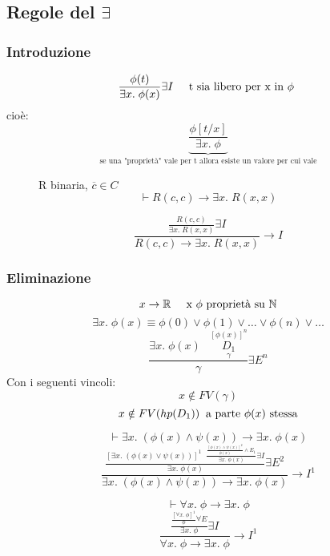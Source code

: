 \documentclass{article}
\theoremstyle{break}
\theoremstyle{break}
\theoremstyle{break}
\theoremstyle{break}
\begin{document}
\subsection{Regole del \( \exists  \)}
\subsubsection{Introduzione}
\[
\frac{\phi(t)}{\exists x.\; \phi(x)} \exists I \;\;\;\;\; \text{t sia libero per x in \( \phi \) }
\] 
cioè:
\[
  \underbrace{\frac{\phi[t/x]}{\exists x.\; \phi}}_{\text{se una "proprietà" vale per t allora
  esiste un valore per cui vale}}
\] 

\begin{figure}[H]
  \begin{example}
    R binaria, \( \overline{c} \in C \) 
    \[
    \vdash R(c,c) \to \exists x.\; R(x,x)
    \] 

    \[
      \frac{\frac{R(c,c)}{\exists x.\; R(x,x)} \exists I}{R(c,c) \to \exists x.\; R(x,x)} \to I
    \] 
  \end{example}
  
\end{figure}

\subsubsection{Eliminazione}
\[
  x \to \mathbb{R} \;\;\;\;\; \text{x \( \phi \) proprietà su \( \mathbb{N} \)}
\] 
\[
  \exists x.\;\phi(x) \equiv \phi(0) \vee \phi(1) \vee \ldots \vee \phi(n) \vee \ldots
\] 
\[
  \frac{\exists x.\;\phi(x) \;\;\; \underset{\gamma}{\stackrel{[\phi(x)]^n}{D_1}}}{\gamma} \exists E^n
\] 
Con i seguenti vincoli:
\[
  x \notin FV(\gamma)
\] 
\[
x \notin FV(hp(D_1))\;\; \text{a parte \( \phi(x) \) stessa}
\] 

\begin{figure}[H]
  \begin{exercise}
    \[
    \vdash \exists x.\; (\phi(x) \wedge \psi(x)) \to \exists x.\; \phi(x)
    \] 
    \[
      \frac{\frac{[\exists x.\; (\phi(x) \vee \psi(x))]^1\;\; \frac{\frac{[\phi(x) \wedge \psi(x)]^2}{\phi(x)} \wedge E_1}{\exists x.\;\phi(x)} \exists I}{\exists x.\;\phi(x)} \exists E^2}{\exists x.\;(\phi(x) \wedge \psi(x)) \to \exists x.\; \phi(x)} \to I^1
    \]  
  \end{exercise}
\end{figure}

\begin{figure}[H]
  \begin{exercise}
    \[
    \vdash \forall x.\; \phi \to \exists x.\;\phi
    \] 
    \[
      \frac{\frac{\frac{[\forall x.\;\phi]^1}{\phi} \forall E}{\exists x.\;\phi} \exists I}{\forall x.\; \phi \to \exists x.\; \phi} \to I^1
    \] 
  \end{exercise}
\end{figure}
\end{document}
